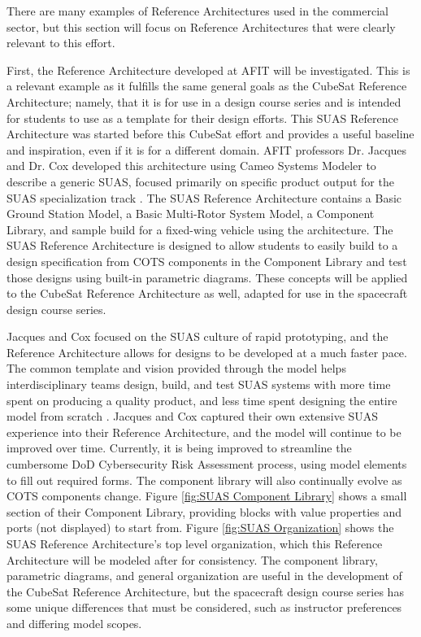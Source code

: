 There are many examples of Reference Architectures used in the commercial sector, but this section will focus on Reference Architectures that were clearly relevant to this effort. 

First, the  Reference Architecture developed at AFIT will be investigated. This is a relevant example as it fulfills the same general goals as the CubeSat Reference Architecture; namely, that it is for use in a design course series and is intended for students to use as a template for their design efforts. This SUAS Reference Architecture was started before this CubeSat effort and provides a useful baseline and inspiration, even if it is for a different domain. AFIT professors Dr. Jacques and Dr. Cox developed this architecture using Cameo Systems Modeler to describe a generic SUAS, focused primarily on specific product output for the SUAS specialization track \citep{Jacques2019}. The SUAS Reference Architecture contains a Basic Ground Station Model, a Basic Multi-Rotor System Model, a Component Library, and sample build for a fixed-wing vehicle using the architecture.  The SUAS Reference Architecture is designed to allow students to easily build to a design specification from COTS components in the Component Library and test those designs using built-in parametric diagrams. These concepts will be applied to the CubeSat Reference Architecture as well, adapted for use in the spacecraft design course series. 


Jacques and Cox focused on the SUAS culture of rapid prototyping, and the Reference Architecture allows for designs to be developed at a much faster pace. The common template and vision provided through the model helps interdisciplinary teams design, build, and test SUAS systems with more time spent on producing a quality product, and less time spent designing the entire model from scratch \citep{Jacques2019}. Jacques and Cox captured their own extensive SUAS experience into their Reference Architecture, and the model will continue to be improved over time. Currently, it is being improved to streamline the cumbersome DoD Cybersecurity Risk Assessment process, using model elements to fill out required forms. The component library will also continually evolve as COTS components change. Figure \ref{fig:SUAS Component Library} shows a small section of their Component Library, providing blocks with value properties and ports (not displayed) to start from. Figure \ref{fig:SUAS Organization} shows the SUAS Reference Architecture's top level organization, which this Reference Architecture will be modeled after for consistency. The component library, parametric diagrams, and general organization are useful in the development of the CubeSat Reference Architecture, but the spacecraft design course series has some unique differences that must be considered, such as instructor preferences and differing model scopes. 

